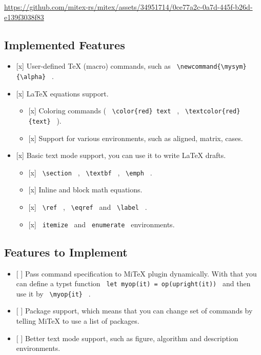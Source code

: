 \url{https://github.com/mitex-rs/mitex/assets/34951714/0ce77a2c-0a7d-445f-b26d-e139f3038f83}

\subsection{Implemented Features}\label{implemented-features}

\begin{itemize}
\tightlist
\item
  {[}x{]} User-defined TeX (macro) commands, such as
  \texttt{\ \textbackslash{}newcommand\{\textbackslash{}mysym\}\{\textbackslash{}alpha\}\ }
  .
\item
  {[}x{]} LaTeX equations support.

  \begin{itemize}
  \tightlist
  \item
    {[}x{]} Coloring commands (
    \texttt{\ \textbackslash{}color\{red\}\ text\ } ,
    \texttt{\ \textbackslash{}textcolor\{red\}\{text\}\ } ).
  \item
    {[}x{]} Support for various environments, such as aligned, matrix,
    cases.
  \end{itemize}
\item
  {[}x{]} Basic text mode support, you can use it to write LaTeX drafts.

  \begin{itemize}
  \tightlist
  \item
    {[}x{]} \texttt{\ \textbackslash{}section\ } ,
    \texttt{\ \textbackslash{}textbf\ } ,
    \texttt{\ \textbackslash{}emph\ } .
  \item
    {[}x{]} Inline and block math equations.
  \item
    {[}x{]} \texttt{\ \textbackslash{}ref\ } ,
    \texttt{\ \textbackslash{}eqref\ } and
    \texttt{\ \textbackslash{}label\ } .
  \item
    {[}x{]} \texttt{\ itemize\ } and \texttt{\ enumerate\ }
    environments.
  \end{itemize}
\end{itemize}

\subsection{Features to Implement}\label{features-to-implement}

\begin{itemize}
\tightlist
\item
  {[} {]} Pass command specification to MiTeX plugin dynamically. With
  that you can define a typst function
  \texttt{\ let\ myop(it)\ =\ op(upright(it))\ } and then use it by
  \texttt{\ \textbackslash{}myop\{it\}\ } .
\item
  {[} {]} Package support, which means that you can change set of
  commands by telling MiTeX to use a list of packages.
\item
  {[} {]} Better text mode support, such as figure, algorithm and
  description environments.
\end{itemize}

